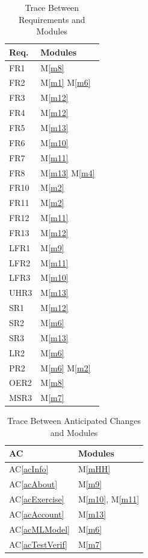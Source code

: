 \documentclass[12pt, titlepage]{article}
\newcommand{\acref}[1]{AC\ref{#1}}
\newcommand{\mref}[1]{M\ref{#1}}
\begin{document}
\begin{table}[H]
\centering
\begin{tabular}{p{} p{}}
\toprule
\textbf{Req.} & \textbf{Modules}\\
\midrule
FR1 & \mref{m8}\\
FR2 & \mref{m1} \mref{m6}\\
FR3 & \mref{m12}\\
FR4 & \mref{m12}\\
FR5 & \mref{m13}\\
FR6 & \mref{m10}\\
FR7 & \mref{m11}\\
FR8 & \mref{m13} \mref{m4}\\
FR10 & \mref{m2}\\
FR11 & \mref{m2}\\
FR12 & \mref{m11}\\
FR13 & \mref{m12}\\
LFR1 & \mref{m9}\\
LFR2 & \mref{m11}\\
LFR3 & \mref{m10}\\
UHR3 & \mref{m13}\\
SR1 & \mref{m12}\\
SR2 & \mref{m6}\\
SR3 & \mref{m13}\\
LR2 & \mref{m6}\\
PR2 & \mref{m6} \mref{m2}\\
OER2 & \mref{m8}\\
MSR3 & \mref{m7}\\
\bottomrule
\end{tabular}
\caption{Trace Between Requirements and Modules}
\label{TblRT}
\end{table}

\begin{table}[H]
\centering
\begin{tabular}{p{} p{}}
\toprule
\textbf{AC} & \textbf{Modules}\\
\midrule
\acref{acInfo} & \mref{mHH}\\
\acref{acAbout} & \mref{m9}\\
\acref{acExercise} & \mref{m10}, \mref{m11}\\
\acref{acAccount} & \mref{m13}\\
\acref{acMLModel} & \mref{m6}\\
\acref{acTestVerif} & \mref{m7}\\
\bottomrule
\end{tabular}
\caption{Trace Between Anticipated Changes and Modules}
\label{TblACT}
\end{table}
\end{document}
